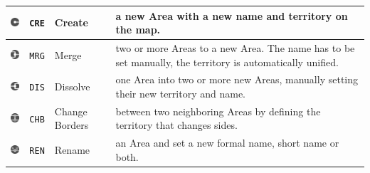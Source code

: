 \vspace{0.5em}
\begin{table}[H]
\begin{center}
\begin{tabular}{m{0.75cm} m{0.8cm} m{2.4cm} m{9.1cm}}
  \toprule

  \raisebox{-0.35\height}
  {\includegraphics[width=0.72cm]{graphics/development/editing_hivent_data/edit_operations/CRE}} &
  \texttt{CRE} & Create &
  a new Area with a new name and territory on the map. \\

  \midrule
  \raisebox{-0.35\height}
  {\includegraphics[width=0.72cm]{graphics/development/editing_hivent_data/edit_operations/MRG}} &
  \texttt{MRG} & Merge &
  two or more Areas to a new Area. The name has to be set manually, the territory is automatically unified. \\

  \midrule
  \raisebox{-0.35\height}
  {\includegraphics[width=0.72cm]{graphics/development/editing_hivent_data/edit_operations/DIS}} &
  \texttt{DIS} & Dissolve &
  one Area into two or more new Areas, manually setting their new territory and name. \\

  \midrule
  \raisebox{-0.35\height}
  {\includegraphics[width=0.72cm]{graphics/development/editing_hivent_data/edit_operations/CHB}} &
  \texttt{CHB} & Change Borders &
  between two neighboring Areas by defining the territory that changes sides. \\

  \midrule
  \raisebox{-0.35\height}
  {\includegraphics[width=0.72cm]{graphics/development/editing_hivent_data/edit_operations/REN}} &
  \texttt{REN} & Rename &
  an Area and set a new formal name, short name or both. \\


\end{tabular}
\end{center}
\end{table}
